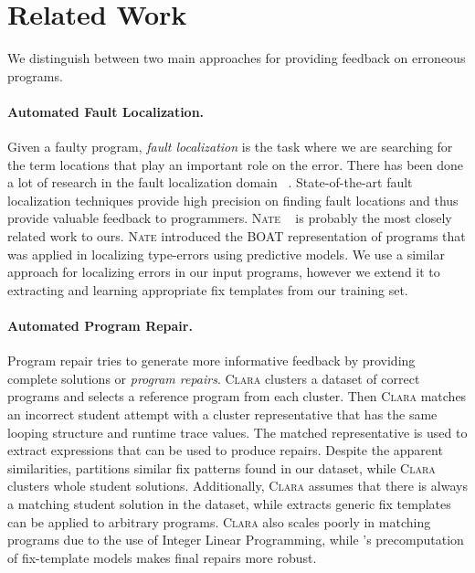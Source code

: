 \section{Related Work}
\label{sec:related-work}
We distinguish between two main approaches for providing feedback on erroneous
programs.

\paragraph{Automated Fault Localization.} Given a faulty program, \emph{fault
localization} is the task where we are searching for the term locations that
play an important role on the error. There has been done a lot of research in
the fault localization domain
~\citep{Seidel:2017,Wand1986-nw,Haack2003-vc,Tip2001-qp}. State-of-the-art fault
localization techniques provide high precision on finding fault locations and
thus provide valuable feedback to programmers. \textsc{Nate}
~\citep{Seidel:2017} is probably the most closely related work to ours.
\textsc{Nate} introduced the BOAT representation of programs that was applied in
localizing type-errors using predictive models. We use a similar approach for
localizing errors in our input programs, however we extend it to extracting and
learning appropriate fix templates from our training set.

\paragraph{Automated Program Repair.} Program repair tries to generate more
informative feedback by providing complete solutions or \emph{program repairs}.
\textsc{Clara} \citep{Gulwani_2018} clusters a dataset of correct programs and
selects a reference program from each cluster. Then \textsc{Clara} matches an
incorrect student attempt with a cluster representative that has the same
looping structure and runtime trace values. The matched representative is used
to extract expressions that can be used to produce repairs. Despite the apparent
similarities, \toolname partitions similar fix patterns found in our dataset,
while \textsc{Clara} clusters whole student solutions. Additionally,
\textsc{Clara} assumes that there is always a matching student solution in the
dataset, while \toolname extracts generic fix templates can be applied to
arbitrary programs. \textsc{Clara} also scales poorly in matching programs due
to the use of Integer Linear Programming, while \toolname's precomputation of
fix-template models makes final repairs more robust.


